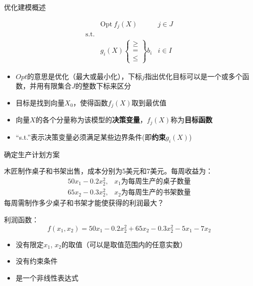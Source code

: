 \documentclass[mathserif, table]{beamer}
\begin{document}
\begin{frame}{优化建模概述}

  \begin{block}{}
    \[ 
    \begin{array}{lcl}
      & \mbox{Opt}\ f_j(X) & j \in J\\
      \mbox{s.t.} & &  \\
      &
      g_i(X) \left\{
        \begin{array}{c}
          \ge\\
          = \\
          \le
        \end{array}
      \right\} b_i& i \in I
    \end{array}
    \]
  \end{block}
  \begin{itemize}
  \item $Opt$的意思是优化（最大或最小化），下标$j$指出优化目标可以是一个或多个函数，并用有限集合$J$的整数下标来区分
  \item 目标是找到向量$X_0$，使得函数$f_j(X)$取到最优值
  \item 向量$X$的各个分量称为该模型的\textbf{决策变量}，$f_j(X)$称为\textbf{目标函数}
  \item ``s.t.''表示决策变量必须满足某些边界条件(即\textbf{约束}$g_i(X)$)
  \end{itemize}
  
\end{frame}

\begin{frame}{确定生产计划方案}
  \begin{block}{}
    木匠制作桌子和书架出售，成本分别为5美元和7美元。每周收益为：
    \[
    \begin{array}{cc}
      50x_1 - 0.2x_2^2, & x_1\text{为每周生产的桌子数量}\\
      65x_2 - 0.3x_2^2, & x_2\text{为每周生产的书架数量}
    \end{array}
    \]
    每周需制作多少桌子和书架才能使获得的利润最大？
  \end{block}
  
  利润函数：
  \[
  f(x_1, x_2) = 50x_1 - 0.2x_2^2 + 65x_2 - 0.3x_2^2 - 5x_1 - 7x_2
  \]

  \begin{itemize}
  \item 没有限定$x_1$, $x_2$的取值（可以是取值范围内的任意实数）
  \item 没有约束条件
  \item 是一个非线性表达式
  \end{itemize}
  
\end{frame}
\end{document}
